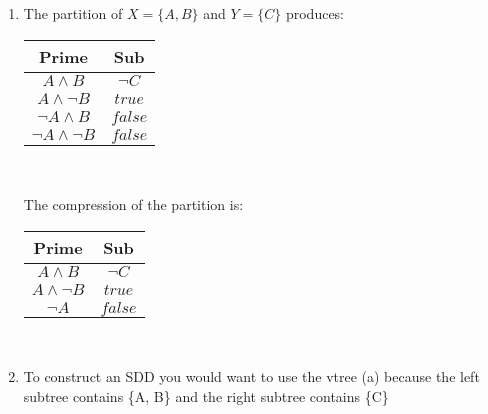\documentclass{article}
\begin{document}
\renewcommand{\labelenumi}{(\alph{enumi})}
 \begin{enumerate}
   \item The partition of $X = \{A,B\}$ and $Y = \{C\}$ produces:
   \begin{center}
           \begin{tabular}{ |c|c| }
            \hline
             Prime&Sub \\ 
             \hline
             $A \land B$ & $\lnot C$ \\
             \hline
             $A \land \lnot B$ & $true$ \\
             \hline
             $\lnot A \land B$ & $false$ \\
             \hline
             $\lnot A \land \lnot B$ & $false$ \\
             \hline
            \end{tabular} \\
    \end{center}
    The compression of the partition is:
    \begin{center}
       \begin{tabular}{ |c|c| }
        \hline
         Prime&Sub \\ 
         \hline
         $A \land B$ & $\lnot C$ \\
         \hline
         $A \land \lnot B$ & $true$ \\
         \hline
         $\lnot A$ & $false$ \\
         \hline
        \end{tabular} \\
    \end{center}
        
   \item To construct an SDD you would want to use the vtree (a) because the left subtree contains \{A, B\} and the right subtree contains \{C\} 
 \end{enumerate}

\clearpage
\section{}

 \clearpage
 \section{}
 
 \clearpage
 \section{}
\end{document}
